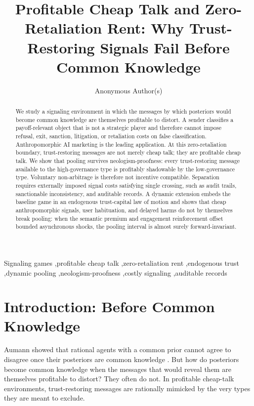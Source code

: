 \documentclass[review,authoryear]{elsarticle}
\theoremstyle{definition}
\theoremstyle{plain}
\begin{document}
\begin{frontmatter}

\title{Profitable Cheap Talk and Zero-Retaliation Rent: Why Trust-Restoring Signals Fail Before Common Knowledge}

\author{Anonymous Author(s)}
\address{Submission \#XXX, USA}

\begin{abstract}
We study a signaling environment in which the messages by which posteriors would become common knowledge are themselves profitable to distort. A sender classifies a payoff-relevant object that is not a strategic player and therefore cannot impose refusal, exit, sanction, litigation, or retaliation costs on false classification. Anthropomorphic AI marketing is the leading application. At this zero-retaliation boundary, trust-restoring messages are not merely cheap talk; they are profitable cheap talk. We show that pooling survives neologism-proofness: every trust-restoring message available to the high-governance type is profitably shadowable by the low-governance type. Voluntary non-arbitrage is therefore not incentive compatible. Separation requires externally imposed signal costs satisfying single crossing, such as audit trails, sanctionable inconsistency, and auditable records. A dynamic extension embeds the baseline game in an endogenous trust-capital law of motion and shows that cheap anthropomorphic signals, user habituation, and delayed harms do not by themselves break pooling: when the semantic premium and engagement reinforcement offset bounded asynchronous shocks, the pooling interval is almost surely forward-invariant.
\end{abstract}

\begin{keyword}
Signaling games \sep profitable cheap talk \sep zero-retaliation rent \sep endogenous trust \sep dynamic pooling \sep neologism-proofness \sep costly signaling \sep auditable records
\end{keyword}

\end{frontmatter}

\section{Introduction: Before Common Knowledge}
\label{sec:introduction}

Aumann showed that rational agents with a common prior cannot agree to disagree once their posteriors are common knowledge \citep{aumann1976agreeing}. But how do posteriors become common knowledge when the messages that would reveal them are themselves profitable to distort? They often do not. In profitable cheap-talk environments, trust-restoring messages are rationally mimicked by the very types they are meant to exclude.
\end{document}
